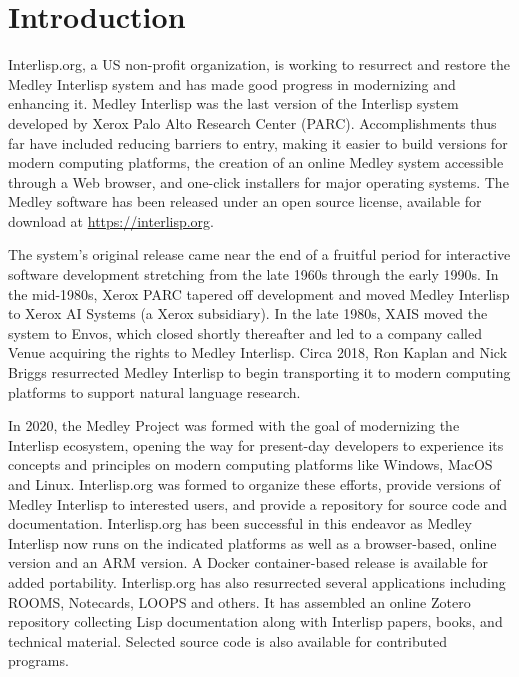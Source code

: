 \documentclass[sigconf]{acmart}
\begin{document}

\maketitle

\section{Introduction}
Interlisp.org, a US non-profit organization, is working to resurrect and restore the Medley Interlisp system and has made good progress in modernizing and enhancing it. Medley Interlisp was the last version of the Interlisp system developed by Xerox Palo Alto Research Center (PARC). Accomplishments thus far have included reducing  barriers to entry, making it easier to build versions for modern computing platforms, the creation of an online Medley system accessible through a Web browser, and one-click installers for major operating systems. The Medley software has been released under an open source license, available for download at \url{https://interlisp.org}.

The system's original release came near the end of a fruitful period for interactive software development stretching from the late 1960s through the early 1990s. In the mid-1980s, Xerox PARC tapered off development and moved Medley Interlisp to Xerox AI Systems (a Xerox subsidiary). In the late 1980s, XAIS moved the system to Envos, which closed shortly thereafter and led to a company called Venue acquiring the rights to Medley Interlisp. Circa 2018, Ron Kaplan and Nick Briggs resurrected Medley Interlisp to begin transporting it to modern computing platforms to support natural language research.

In 2020, the Medley Project was formed with the goal of modernizing the Interlisp ecosystem, opening the way for present-day developers to experience its concepts and principles on modern computing platforms like Windows, MacOS and Linux. Interlisp.org was formed to organize these efforts, provide versions of Medley Interlisp to interested users, and provide a repository for source code and documentation. Interlisp.org has been successful in this endeavor as Medley Interlisp now runs on the indicated platforms as well as a browser-based, online version and an ARM version. A Docker container-based release is available for added portability. Interlisp.org has also resurrected several applications including ROOMS, Notecards, LOOPS and others. It has assembled an online Zotero repository collecting Lisp documentation along with Interlisp papers, books, and technical material. Selected source code is also available for contributed programs.
\end{document}
